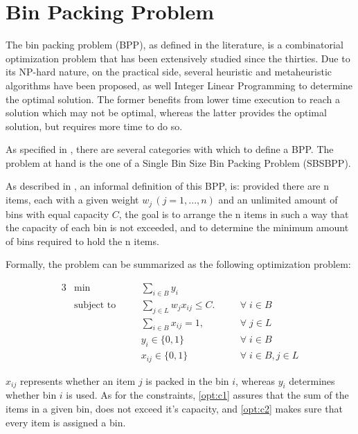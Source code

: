 \chapter{Bin Packing Problem} \label{chap:literature review}

The bin packing problem (BPP), as defined in the literature, is a combinatorial optimization problem that has been extensively studied since the thirties. Due to its NP-hard nature, on the practical side, several heuristic and metaheuristic algorithms have been proposed, as well Integer Linear Programming to determine the optimal solution. The former benefits from lower time execution to reach a solution which may not be optimal, whereas the latter provides the optimal solution, but requires more time to do so.

As specified in \cite{wascher2007improved}, there are several categories with which to define a BPP. The problem at hand is the one of a Single Bin Size Bin Packing Problem (SBSBPP).

As described in \cite{delorme2016bin}, an informal definition of this BPP, is: provided there are n items, each with a given weight \( w_j  \, (j = 1, ..., n) \) and an unlimited amount of bins with equal capacity \( C \), the goal is to arrange the n items in such a way that the capacity of each bin is not exceeded, and to determine the minimum amount of bins required to hold the n items.

Formally, the problem can be summarized as the following optimization problem:

\begin{alignat}{3}
\label{BPP model}
    &\min &&\sum_{i \in B} y_i && \\
    &\text{subject to} \quad
                && \sum_{j \in L} w_j x_{ij} \leq C. \quad          && \forall \; i \in B \label{opt:c1}\\
    &           && \sum_{i \in B} x_{ij} = 1, \quad                 && \forall \; j \in L \label{opt:c2} \\
    &           && y_i \in \{0, 1\}                                 && \forall \; i \in B \\
    &           && x_{ij} \in \{0,1\}                               && \forall \; i \in B, j \in L
\end{alignat}

$x_{ij}$ represents whether an item $j$ is packed in the bin $i$, whereas $y_i$ determines whether bin $i$ is used. As for the constraints, \ref{opt:c1} assures that the sum of the items in a given bin, does not exceed it's capacity, and \ref{opt:c2} makes sure that every item is assigned a bin. 

